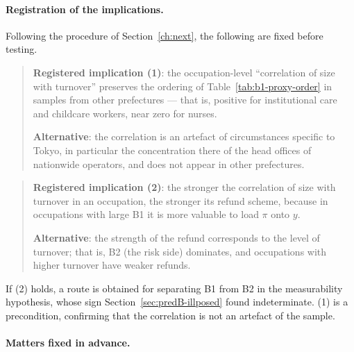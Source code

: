 \paragraph{Registration of the implications.}
Following the procedure of Section~\ref{ch:next}, the following are fixed before testing.

\begin{quote}
\textbf{Registered implication (1)}: the occupation-level ``correlation of size with turnover''
preserves the ordering of Table~\ref{tab:b1-proxy-order} in samples from other prefectures — that
is, positive for institutional care and childcare workers, near zero for nurses.

\textbf{Alternative}: the correlation is an artefact of circumstances specific to Tokyo, in
particular the concentration there of the head offices of nationwide operators, and does not
appear in other prefectures.
\end{quote}

\begin{quote}
\textbf{Registered implication (2)}: the stronger the correlation of size with turnover in an
occupation, the stronger its refund scheme, because in occupations with large B1 it is more
valuable to load $\pi$ onto $y$.

\textbf{Alternative}: the strength of the refund corresponds to the level of turnover; that is,
B2 (the risk side) dominates, and occupations with higher turnover have weaker refunds.
\end{quote}

If (2) holds, a route is obtained for separating B1 from B2 in the measurability hypothesis, whose
sign Section~\ref{sec:predB-illposed} found indeterminate. (1) is a precondition, confirming that
the correlation is not an artefact of the sample.

\paragraph{Matters fixed in advance.}

